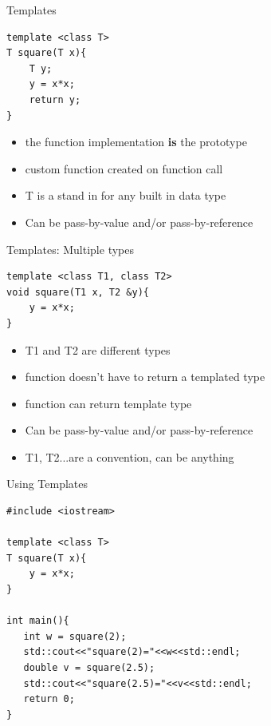 \documentclass[xcolor={dvipsnames}]{beamer}
\begin{document}
\begin{frame}[fragile]{Templates}
	\begin{center} 
	\begin{verbatim}
template <class T>
T square(T x){
    T y;
    y = x*x;
    return y;
}   
	\end{verbatim}
	\end{center}
	\begin{center}
		\begin{itemize}
			\item the function implementation \textbf{is} the prototype
			\item custom function created on function call
			\item T is a stand in for any built in data type
			\item Can be pass-by-value and/or pass-by-reference	
		\end{itemize}
	\end{center}
\end{frame}

\begin{frame}[fragile]{Templates: Multiple types}
	\begin{center} 
	\begin{verbatim}
template <class T1, class T2>
void square(T1 x, T2 &y){
    y = x*x;
}   
	\end{verbatim}
	\end{center}
	\begin{center}
		\begin{itemize}
			\item T1 and T2 are different types
			\item function doesn't have to return a templated type
			\item function can return template type
			\item Can be pass-by-value and/or pass-by-reference
			\item T1, T2...are a convention, can be anything
		\end{itemize}
	\end{center}
\end{frame}

\begin{frame}[fragile]{Using Templates}
\begin{verbatim}
#include <iostream>

template <class T>
T square(T x){
    y = x*x;
}

int main(){
   int w = square(2);
   std::cout<<"square(2)="<<w<<std::endl;
   double v = square(2.5);
   std::cout<<"square(2.5)="<<v<<std::endl;
   return 0;
}
\end{verbatim}
\end{frame}
\end{document}
